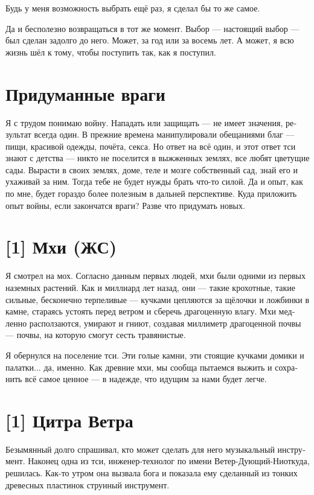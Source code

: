 \documentclass[a4paper,12pt,fleqn]{book}\usepackage{cooltooltips}\usepackage{polyglossia}\setdefaultlanguage[babelshorthands=true]{russian}\setotherlanguage{english}\defaultfontfeatures{Ligatures=TeX,Mapping=tex-text} \usepackage{xcolor}\definecolor{lightgray}{HTML}{bbbbbb}\color{lightgray}\newcommand{\ml}[3]{\textenglish{\textcolor{black}{#3}}}
\begin{document}
{Будь у меня возможность выбрать ещё раз, я сделал бы то же самое.

Да и бесполезно возвращаться в тот же момент.
Выбор --- настоящий выбор --- был сделан задолго до него.
Может, за год или за восемь лет.
А может, я всю жизнь шёл к тому, чтобы поступить так, как я поступил.

\section{Придуманные враги}

Я с трудом понимаю войну.
Нападать или защищать --- не имеет значения, результат всегда один.
В прежние времена манипулировали обещаниями благ --- пищи, красивой одежды, почёта, секса.
Но ответ на всё один, и этот ответ тси знают с детства --- никто не поселится в выжженных землях, все любят цветущие сады.
Вырасти в своих землях, доме, теле и мозге собственный сад, знай его и ухаживай за ним.
Тогда тебе не будет нужды брать что-то силой.
Да и опыт, как по мне, будет гораздо более полезным в дальней перспективе.
Куда приложить опыт войны, если закончатся враги?
Разве что придумать новых.

\section{[1] Мхи (ЖС)}

Я смотрел на мох.
Согласно данным первых людей, мхи были одними из первых наземных растений.
Как и миллиард лет назад, они --- такие крохотные, такие сильные, бесконечно терпеливые --- кучками цепляются за щёлочки и ложбинки в камне, стараясь устоять перед ветром и сберечь драгоценную влагу.
Мхи медленно расползаются, умирают и гниют, создавая миллиметр драгоценной почвы --- почвы, на которую смогут сесть травянистые.

Я обернулся на поселение тси.
Эти голые камни, эти стоящие кучками домики и палатки... да, именно.
Как древние мхи, мы сообща пытаемся выжить и сохранить всё самое ценное --- в надежде, что идущим за нами будет легче.

\section{[1] Цитра Ветра}

Безымянный долго спрашивал, кто может сделать для него музыкальный инструмент.
Наконец одна из тси, инженер-технолог по имени Ветер-Дующий-Ниоткуда, решилась.
Как-то утром она вызвала бога и показала ему сделанный из тонких древесных пластинок струнный инструмент.

}
\end{document}
